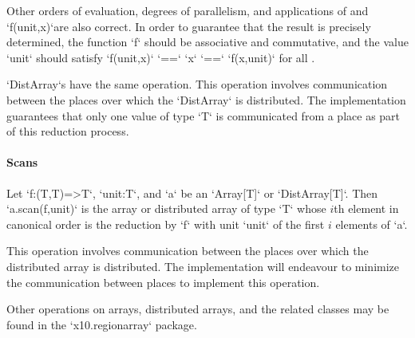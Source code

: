 Other orders of evaluation, degrees of parallelism, and applications of
 and \xcd`f(unit,x)`are also correct.
In order to guarantee that the result is precisely
determined, the  function \xcd`f` should be associative and
commutative, and the value \xcd`unit` should satisfy
\xcd`f(unit,x)` \xcd`==` \xcd`x` \xcd`==` \xcd`f(x,unit)`
for all .  




\xcd`DistArray`s have the same operation.
This operation involves communication between the places over which
the \xcd`DistArray` is distributed. The \Xten{} implementation guarantees that
only one value of type \xcd`T` is communicated from a place as part of
this reduction process.

\paragraph{Scans}\label{ArrayScans}


Let \xcd`f:(T,T)=>T`, \xcd`unit:T`, and \xcd`a` be an \xcd`Array[T]` or
\xcd`DistArray[T]`.  Then \xcd`a.scan(f,unit)` is the array or distributed
array of type \xcd`T` whose {$i$}th element in canonical order is the
reduction by \xcd`f` with unit \xcd`unit` of the first {$i$} elements of
\xcd`a`. 


This operation involves communication between the places over which the
distributed array is distributed. The \Xten{} implementation will endeavour to
minimize the communication between places to implement this operation.

Other operations on arrays, distributed arrays, and the related classes may be
found in the \xcd`x10.regionarray` package.
